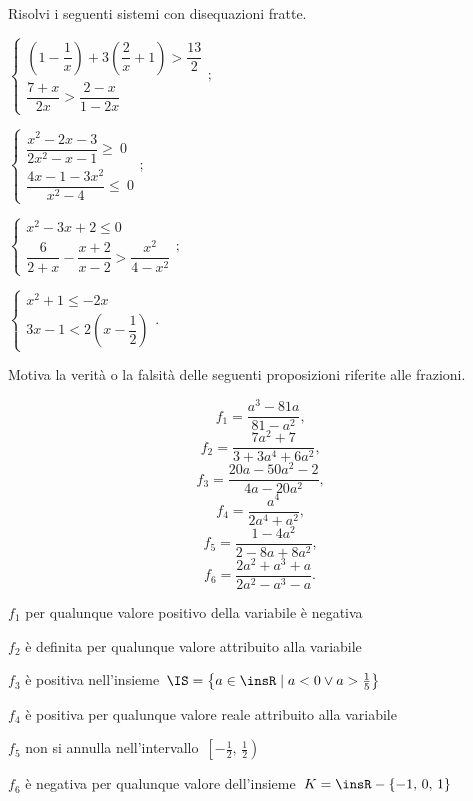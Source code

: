 \begin{esercizio}[\Ast]
\label{ese:20.75}
Risolvi i seguenti sistemi con disequazioni fratte.
\begin{multicols}{2}
\begin{enumeratea}{\longarray
 \item $\left\{\begin{array}{l}
		\left(1-\dfrac{1}{x}\right)+3\left(\dfrac{2}{x}+1\right)>\dfrac{13}{2}\\
		\dfrac{7+x}{2x}>\dfrac{2-x}{1-2x}
   \end{array}\right.;$
\item $\left\{\begin{array}{l}
		\dfrac{x^{2}-2x-3}{2x^{2}-x-1}\ge~0\\
		\dfrac{4x-1-3x^{2}}{x^{2}-4}\le~0
	\end{array}\right.;$
\item $\left\{\begin{array}{l}
		x^{2}-3x+2\le0\\
		\dfrac{6}{2+x}-\dfrac{x+2}{x-2}>\dfrac{x^{2}}{4-x^{2}}
	\end{array}\right.;$
\item $\left\{\begin{array}{l}
		x^{2}+1\le -2x\\
		3x-1<2\left(x-\dfrac{1}{2}\right)
		\end{array}\right..$}
\end{enumeratea}
\end{multicols}
\end{esercizio}

\begin{esercizio}
\label{ese:20.76}
Motiva la verità o la falsità delle seguenti
proposizioni riferite alle frazioni.
\begin{multicols}{3}
\noindent\[f_{1}=\frac{a^{3}-81a}{81-a^{2}}\text{,}\]
\[f_{2}=\frac{7a^{2}+7}{3+3a^{4}+6a^{2}}\text{,}\]
\[f_{3}=\frac{20a-50a^{2}-2}{4a-20a^{2}}\text{,}\]
\[f_{4}=\frac{a^{4}}{2a^{4}+a^{2}}\text{,}\]
\[f_{5}=\frac{1-4a^{2}}{2-8a+8a^{2}}\text{,}\]
\[f_{6}=\frac{2a^{2}+a^{3}+a}{2a^{2}-a^{3}-a}.\]
\end{multicols}
\begin{enumeratea}
\TabPositions{11cm}
\item $f_{1}$ per qualunque valore positivo della variabile è negativa \tab\boxV\quad\boxF
\item $f_{2}$ è definita per qualunque valore attribuito alla variabile \tab\boxV\quad\boxF
\item $f_{3}$ è positiva nell'insieme~$\IS=\left\{a\in \insR\;|\;a<0\vee a>\frac{1}{5}\right\}$ \tab\boxV\quad\boxF
\item $f_{4}$ è positiva per qualunque valore reale attribuito alla variabile \tab\boxV\quad\boxF
\item $f_{5}$ non si annulla nell'intervallo~$\left[-\frac{1}{2}\text{,~}\frac{1}{2}\right)$ \tab\boxV\quad\boxF
\item $f_{6}$ è negativa per qualunque valore dell'insieme~$K=\insR-\{-1\text{,~}0\text{,~}1\}$ \tab\boxV\quad\boxF
\end{enumeratea}
\end{esercizio}

